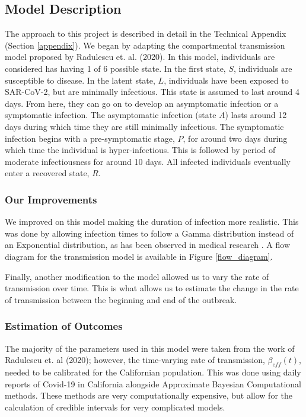 \documentclass[11pt]{article}
\begin{document}
\subsection{Model Description}
The approach to this project is described in detail in the Technical Appendix (Section \ref{appendix}). 
We began by adapting the compartmental transmission model proposed by 
Radulescu et. al. (2020)\cite{radulescu_management_2020}.  In this model, individuals are considered has having 1 of 6 
possible state.  In the first state, $S$, individuals are susceptible to disease.  In the latent state, $L$, individuals
have been exposed to SAR-CoV-2, but are minimally infectious. This state is assumed to last around 4 days.  
From here, they can go on to develop an asymptomatic infection or a symptomatic infection. The asymptomatic infection 
(state $A$) lasts around 12 days during which time they are still minimally infectious.  The symptomatic infection begins with
a pre-symptomatic stage, $P$, for around two days during which time the individual is hyper-infectious. This is followed by 
period of moderate infectiousness for around 10 days.  All infected individuals eventually enter a recovered state, $R$.

\subsubsection{Our Improvements}
We improved on this model making the duration of infection more 
realistic. This was done by allowing infection times to follow a Gamma distribution instead of an Exponential distribution,
as has been observed in medical research \cite{brauer_mathematical_2019}.  A flow diagram for the transmission model is 
available in Figure \ref{flow_diagram}.

Finally, another modification to the model allowed us to vary the rate of transmission over time. This is what allows
us to estimate the change in the rate of transmission between the beginning and end of the outbreak.

\subsubsection{Estimation of Outcomes}
The majority of the parameters used in this model were taken from the work of Radulescu et. al (2020); however, the time-varying 
rate of transmission, $\beta_{eff}(t)$, needed to be calibrated for the Californian population.  This was done using 
daily reports of Covid-19 in California alongside Approximate Bayesian Computational methods.  These methods are very
computationally expensive, but allow for the calculation of credible intervals for very complicated models.
\end{document}
